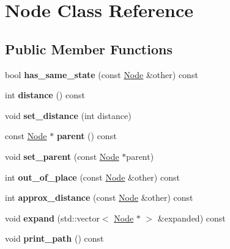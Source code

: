 \hypertarget{classNode}{
\section{Node Class Reference}
\label{classNode}
}
\subsection*{Public Member Functions}
\begin{DoxyCompactItemize}
\item 
\hypertarget{classNode_a04535ea56222fb056ac3f9cdb2b0e9dc}{
bool {\bfseries has\_\-same\_\-state} (const \hyperlink{classNode}{Node} \&other) const }
\label{classNode_a04535ea56222fb056ac3f9cdb2b0e9dc}

\item 
\hypertarget{classNode_a7f6a233887089a7088a7cff703923e35}{
int {\bfseries distance} () const }
\label{classNode_a7f6a233887089a7088a7cff703923e35}

\item 
\hypertarget{classNode_a9538475d28df6250d4b3bb383e2c638a}{
void {\bfseries set\_\-distance} (int distance)}
\label{classNode_a9538475d28df6250d4b3bb383e2c638a}

\item 
\hypertarget{classNode_a0dd99341f384d0cbe602792b4aac82ba}{
const \hyperlink{classNode}{Node} $\ast$ {\bfseries parent} () const }
\label{classNode_a0dd99341f384d0cbe602792b4aac82ba}

\item 
\hypertarget{classNode_a85d2f936141b11c283ebfb6e2ba3c4d4}{
void {\bfseries set\_\-parent} (const \hyperlink{classNode}{Node} $\ast$parent)}
\label{classNode_a85d2f936141b11c283ebfb6e2ba3c4d4}

\item 
\hypertarget{classNode_afff505e516a56aff71078703f6dcff54}{
int {\bfseries out\_\-of\_\-place} (const \hyperlink{classNode}{Node} \&other) const }
\label{classNode_afff505e516a56aff71078703f6dcff54}

\item 
\hypertarget{classNode_a487d897836ff22b0932e762db41b1d85}{
int {\bfseries approx\_\-distance} (const \hyperlink{classNode}{Node} \&other) const }
\label{classNode_a487d897836ff22b0932e762db41b1d85}

\item 
\hypertarget{classNode_aadf864009ae1cc1adb8aa8a3807ab428}{
void {\bfseries expand} (std::vector$<$ \hyperlink{classNode}{Node} $\ast$ $>$ \&expanded) const }
\label{classNode_aadf864009ae1cc1adb8aa8a3807ab428}

\item 
\hypertarget{classNode_ad075488abbd00d3be0f3515839a6b47c}{
void {\bfseries print\_\-path} () const }
\label{classNode_ad075488abbd00d3be0f3515839a6b47c}

\end{DoxyCompactItemize}
